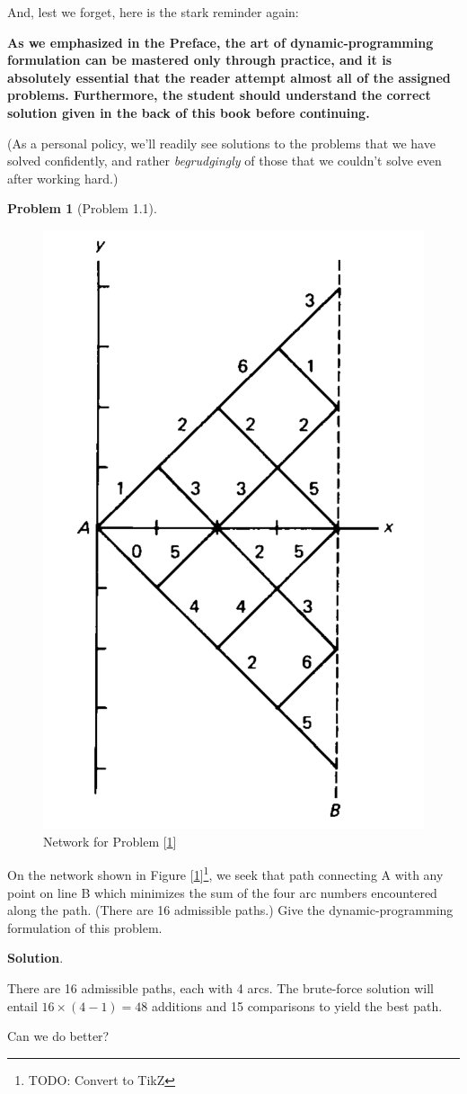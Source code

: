 \documentclass[english,notitlepage,smartquotes]{hgbreport}
\theoremstyle{definition}
\theoremstyle{definition}
\newtheorem{problem}{Problem}
\theoremstyle{remark}
\theoremstyle{definition}
\theoremstyle{plain}
\theoremstyle{definition}
\begin{document}
And, lest we forget, here is the stark reminder again:

\hrulefill

\textbf{As we emphasized in the Preface, the art of dynamic-programming formulation can be mastered only through practice, and it is absolutely essential that the reader attempt almost all of the assigned problems.  Furthermore, the student should understand the correct solution given in the back of this book before continuing.}

\hrulefill

(As a personal policy, we'll readily see solutions to the problems that we have solved confidently, and rather \emph{begrudgingly} of those that we couldn't solve even after working hard.)


\begin{problem}[Problem 1.1]
\begin{figure}[!h]
\centering
\includegraphics[width=.345\textwidth]{p11-pt-to-line}
\caption{Network for Problem [\ref{pr:1.1}]}
\label{fig:p1.1}
\end{figure}
On the network shown in Figure [\ref{fig:p1.1}]\footnote{TODO: Convert to TikZ}, we seek that path connecting A with any point on line B which minimizes the sum of the four arc numbers encountered along the path. (There are 16 admissible paths.) Give the dynamic-programming formulation of this problem.
\label{pr:1.1}
\end{problem}
\textbf{Solution}.

There are 16 admissible paths, each with 4 arcs. The brute-force solution will entail $16\times(4-1)=48$ additions and 15 comparisons to yield the best path. 

Can we do better?
\end{document}
